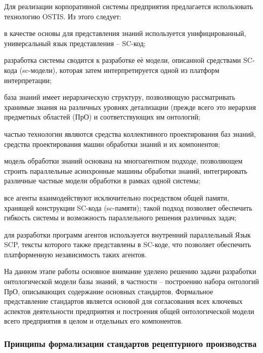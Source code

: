 Для реализации корпоративной системы предприятия предлагается использовать технологию OSTIS. Из этого следует:
\begin{textitemize}
    \item в качестве основы для представления знаний используется унифицированный, универсальный язык представления – SC-код;
    \item разработка системы сводится к разработке еѐ модели, описанной средствами SC-кода (sc-модели), которая затем интерпретируется одной из платформ интерпретации;
    \item база знаний имеет иерархическую структуру, позволяющую рассматривать хранимые знания на различных уровнях детализации (прежде всего это иерархия предметных областей (ПрО) и соответствующих им онтологий;
    \item частью технологии являются средства коллективного проектирования баз знаний, средства проектирования машин обработки знаний и их компонентов;
    \item модель обработки знаний основана на многоагентном подходе, позволяющем строить параллельные асинхронные машины обработки знаний, интегрировать различные частные модели обработки в рамках одной системы;
    \item все агенты взаимодействуют исключительно посредством общей памяти, хранящей конструкции SC-кода (sc-памяти); такой подход позволяет обеспечить гибкость системы и возможность параллельного решения различных задач;
    \item для разработки программ агентов используется внутренний параллельный Язык SCP, тексты которого также представлены в SC-коде, что позволяет обеспечить платформенную независимость таких агентов.
\end{textitemize}

На данном этапе работы основное внимание уделено решению задачи разработки онтологической модели базы знаний, в частности – построению набора онтологий ПрО, описывающих содержание основных стандартов. Формальное представление стандартов является основой для согласования всех ключевых аспектов деятельности предприятия и построения общей онтологической модели всего предприятия в целом и отдельных его компонентов.

\subsubsection{Принципы формализации стандартов рецептурного производства}
\label{sec_chapter_enterprise_formalization_principles_for_prescription_production}



